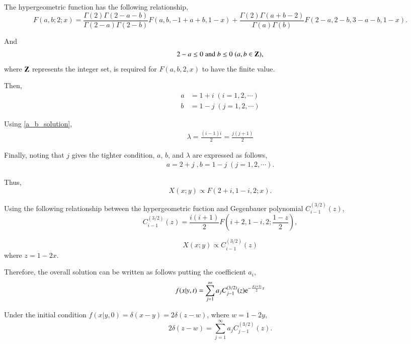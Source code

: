 \documentclass{article}
\begin{document}
The hypergeometric function has the following relationship,
\begin{equation}
 F(a,b;2 ; x) = \frac{\Gamma(2) \Gamma(2-a-b)}{\Gamma(2-a) \Gamma(2-b)} F(a,b,-1+a+b, 1-x)
  + \frac{\Gamma(2) \Gamma(a+b-2)}{\Gamma(a) \Gamma(b)} F(2-a,2-b,3-a-b, 1-x).
\end{equation}

And
\begin{equation}
 2-a \leq 0 \; \text{and}\; b \leq 0 \; (a, b \in \bold{Z}),
\end{equation}
where $\bold{Z}$ represents the integer set, is required for $F(a,b,2,x)$ to have the finite value.

Then,
\begin{align}
 a &= 1 + i \; (i=1,2,\cdots)\\
 b &= 1 - j \; (j=1,2,\cdots)
\end{align}

Using \eqref{a_b_solution},
\begin{align}
 \lambda = \frac{(i-1)i}{2} = \frac{j(j+1)}{2}
\end{align}

Finally, noting that $j$ gives the tighter condition, $a$, $b$, and $\lambda$ are expressed as follows,
\begin{align}
 a = 2 + j \;, b = 1 - j \; (j=1,2,\cdots).
\end{align}

Thus,
\begin{equation}
 X(x;y) \propto F(2+i, 1-i, 2; x).
\end{equation}

Using the following relationship between the hypergeometric fuction and Gegenbauer polynomial $C^{(3/2)}_{i-1} (z)$,
\begin{equation}
 C^{(3/2)}_{i-1} (z) = \frac{i(i+1)}{2} F \left(i+2, 1-i, 2;\frac{1-z}{2}\right),
\end{equation}

\begin{equation}
 X(x;y) \propto C^{(3/2)}_{i-1} (z)
\end{equation}
where $z = 1-2x$.

Therefore, the overall solution can be written as follows putting the coefficient $a_i$,
\begin{equation}
 f(x|y,t) = \sum_{j=1}^{\infty} a_j C^{(3/2)}_{j-1} (z) \mathrm{e}^{-\frac{j(j+1)}{2}\tau}
\end{equation}

Under the initial condition $f(x|y,0) = \delta(x - y) = 2\delta(z-w)$, where $w=1-2y$,
\begin{equation}
 2\delta(z-w) = \sum_{j=1}^{\infty} a_j C^{(3/2)}_{j-1} (z).
\end{equation}
\end{document}

